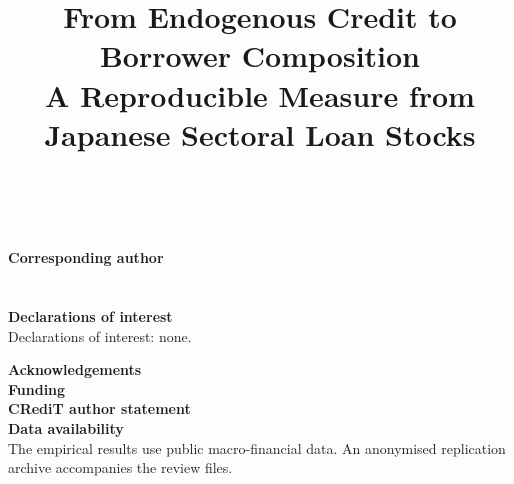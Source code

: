 \documentclass[11pt]{article}
\title{From Endogenous Credit to Borrower Composition\\
\large A Reproducible Measure from Japanese Sectoral Loan Stocks}
\author{\AuthorNames\\[0.6em]\small\AuthorAffiliations}
\date{}
\newcommand{\CorrespondingAuthor}{[Insert corresponding author]}
\newcommand{\CorrespondingAddress}{[Insert full postal address]}
\newcommand{\CorrespondingEmail}{[Insert email address]}
\newcommand{\Acknowledgements}{[Insert acknowledgements, or ``None.'']}
\newcommand{\FundingStatement}{[Insert funding statement, or state that no
specific funding was received]}
\newcommand{\CRediTStatement}{[Insert author initials and CRediT roles]}
\begin{document}
\maketitle

\thispagestyle{empty}

\noindent\textbf{Corresponding author}\\
\CorrespondingAuthor\\
\CorrespondingAddress\\
\CorrespondingEmail

\bigskip
\noindent\textbf{Declarations of interest}\\
Declarations of interest: none.

\bigskip
\noindent\textbf{Acknowledgements}\\
\Acknowledgements

\bigskip
\noindent\textbf{Funding}\\
\FundingStatement

\bigskip
\noindent\textbf{CRediT author statement}\\
\CRediTStatement

\bigskip
\noindent\textbf{Data availability}\\
The empirical results use public macro-financial data. An anonymised
replication archive accompanies the review files.
\end{document}
